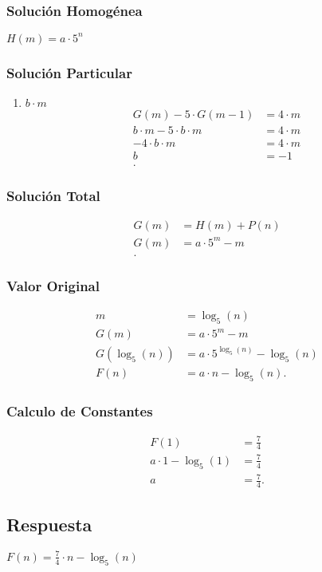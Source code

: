     \subsubsection*{Solución Homogénea}
    $H\left( m \right) = a\cdot 5^{n}$
    \subsubsection*{Solución Particular}
    \begin{enumerate}
      \item $b\cdot m$
	\begin{align*}
	  G\left( m \right) - 5 \cdot G\left( m - 1 \right) &= 4 \cdot m \\
	  b\cdot m - 5\cdot b \cdot m &= 4\cdot m \\
	  -4\cdot b \cdot m &= 4\cdot m \\
	  b &= -1 \\
	.\end{align*}
    \end{enumerate}
    \subsubsection*{Solución Total}
    \begin{align*}
      G\left( m \right) &= H\left( m \right) + P\left( n \right)  \\
      G\left( m \right) &= a\cdot 5^{m} - m \\
    .\end{align*}
    \subsubsection*{Valor Original}
    \begin{align*}
      m &= \log_5\left( n \right) \\
      G\left( m \right) &= a\cdot 5^{m} - m \\
      G\left( \log_5\left( n \right)  \right) &= a\cdot 5^{\log_{5}\left( n \right) } - \log_5\left( n \right)  \\
      F\left( n \right) &= a \cdot n - \log_5\left( n \right)
    .\end{align*}

    \subsubsection*{Calculo de Constantes}
    \begin{align*}
      F\left( 1 \right) &= \frac{7}{4} \\
      a \cdot 1 - \log_5\left( 1 \right)  &= \frac{7}{4} \\
      a &= \frac{7}{4}
    .\end{align*}

    \subsection{Respuesta}
    $F\left( n \right) = \frac{7}{4} \cdot n - \log_5\left( n \right)  $

